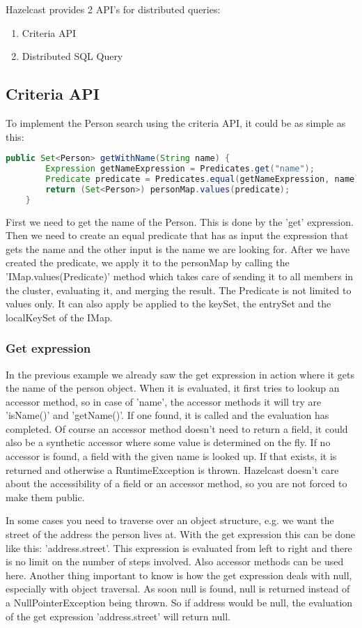 Hazelcast provides 2 API's for distributed queries:
\begin{enumerate}
\item Criteria API
\item Distributed SQL Query
\end{enumerate}

\subsection*{Criteria API}
To implement the Person search using the criteria API, it could be as simple as this:
\begin{lstlisting}[language=java]
    public Set<Person> getWithName(String name) {
        Expression getNameExpression = Predicates.get("name");
        Predicate predicate = Predicates.equal(getNameExpression, name);
        return (Set<Person>) personMap.values(predicate);
    }
\end{lstlisting}
First we need to get the name of the Person. This is done by the 'get' expression. Then we need to create an equal predicate that has as input the expression that gets the name and the other input is the name we are looking for. After we have created the predicate, we apply it to the personMap by calling the 'IMap.values(Predicate)' method which takes care of sending it to all members in the cluster, evaluating it, and merging the result. The Predicate is not limited to values only. It can also apply be applied to the keySet, the entrySet and the localKeySet of the IMap. 

\subsubsection*{Get expression}
In the previous example we already saw the get expression in action where it gets the name of the person object. When it is evaluated, it first tries to lookup an accessor method, so in case of 'name', the accessor methods it will try are 'isName()' and 'getName()'. If one found, it is called and the evaluation has completed. Of course an accessor method doesn't need to return a field, it could also be a synthetic accessor where some value is determined on the fly. If no accessor is found, a field with the given name is looked up. If that exists, it is returned and otherwise a RuntimeException is thrown. Hazelcast doesn't care about the accessibility of a field or an accessor method, so you are not forced to make them public.

In some cases you need to traverse over an object structure, e.g. we want the street of the address the person lives at. With the get expression this can be done like this: 'address.street'. This expression is evaluated from left to right and there is no limit on the number of steps involved. Also accessor methods can be used here. Another thing important to know is how the get expression deals with null, especially with object traversal. As soon null is found, null is returned instead of a NullPointerException being thrown. So if address would be null, the evaluation of the get expression 'address.street' will return null.

